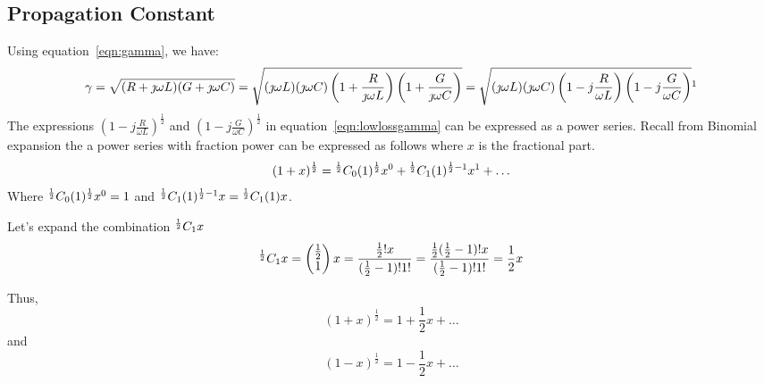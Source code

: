 \subsection{Propagation Constant}
Using equation~\eqref{eqn:gamma}, we have:
\begin{dmath}
\gamma = \sqrt{(R + \jmath\omega L)(G + \jmath\omega C)}
= \sqrt{{(\jmath\omega L)(\jmath\omega C)\left(1 + \frac{R}{\jmath\omega L}\right)\left(1 + \frac{G}{\jmath\omega C}\right)}}
= \sqrt{{(\jmath\omega L)(\jmath\omega C)\left(1 - j\frac{R}{\omega L}\right)\left(1 - j\frac{G}{\omega C}\right)}}\footnotemark
\label{eqn:lowlossgamma}
\end{dmath}
The expressions $\left(1 - j\frac{R}{\omega L}\right)^{\frac{1}{2}}$ and $\left(1 - j\frac{G}{\omega C}\right)^{\frac{1}{2}}$ in equation~\eqref{eqn:lowlossgamma} can be expressed as a power series. Recall from Binomial expansion the a power series with fraction power can be expressed as follows where $x$ is the fractional part.
\begin{dmath*}
(1 + x)^{\frac{1}{2}} = \Comb{\frac{1}{2}}{0}(1)^{\frac{1}{2}}x^0 + \Comb{\frac{1}{2}}{1}(1)^{{\frac{1}{2}} - 1}x^1 + \ldots
\end{dmath*}
Where ${}^{\frac{1}{2}}C_{0}(1)^{\frac{1}{2}}x^0 = 1$ and ${}^{\frac{1}{2}}C_{1}(1)^{\frac{1}{2} - 1}x = {}^{\frac{1}{2}}C_{1}(1)x$.

Let's expand the combination ${}^{\frac{1}{2}}C_{1} x$
\begin{dmath*}
\Comb{\frac{1}{2}}{1} x = \begin{pmatrix}\frac{1}{2}\\1 \end{pmatrix}x = \frac{\frac{1}{2}! x}{(\frac{1}{2} - 1)!1!} = \frac{\frac{1}{2}(\frac{1}{2} - 1)! x}{(\frac{1}{2} - 1)!1!} = \frac{1}{2}x
\end{dmath*}

Thus,
\[(1 + x)^{\frac{1}{2}} = 1 + \frac{1}{2}x + \ldots\]
and
\[(1 - x)^{\frac{1}{2}} = 1 - \frac{1}{2}x + \ldots\]

